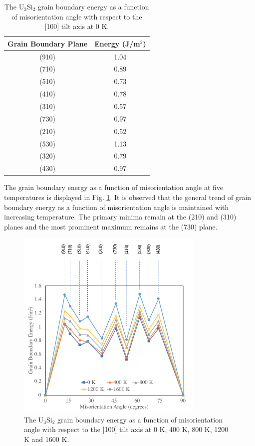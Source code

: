 \documentclass[review]{elsarticle}
\begin{document}
\begin{table}[h]
\caption{The U$_{3}$Si$_{2}$ grain boundary energy as a function of misorientation angle with respect to the [100] tilt axis at 0 K.} \label{tab:0k}
\begin{center}
\begin{tabular}{|c|c|}
	\hline
	Grain Boundary Plane & Energy (J/m$^{2}$) \\
	 \hline
	 (910) & 1.04 \\
	 (710) & 0.89 \\
	 (510) & 0.73 \\
	 (410) & 0.78 \\
	 (310) & 0.57 \\	 
	 (730) & 0.97 \\
	 (210) & 0.52 \\
	 (530) & 1.13 \\
	 (320) & 0.79 \\
	 (430) & 0.97 \\
	 \hline
\end{tabular}
\end{center}
\label{default}
\end{table}

\FloatBarrier

The grain boundary energy as a function of misorientation angle at five temperatures is displayed in Fig. \ref{fig:gbtemp}. It is observed that the general trend of grain boundary energy as a function of misorientation angle is maintained with increasing temperature. The primary minima remain at the (210) and (310) planes and the most prominent maximum remains at the (730) plane. 

\begin{figure}[h]
 \centering
 \includegraphics[width=0.8\textwidth]{gb_vs_T.png} 
 \caption{The U$_{3}$Si$_{2}$ grain boundary energy as a function of misorientation angle with respect to the [100] tilt axis at 0 K, 400 K, 800 K, 1200 K and 1600 K.}
 \label{fig:gbtemp}
\end{figure}
\end{document}
